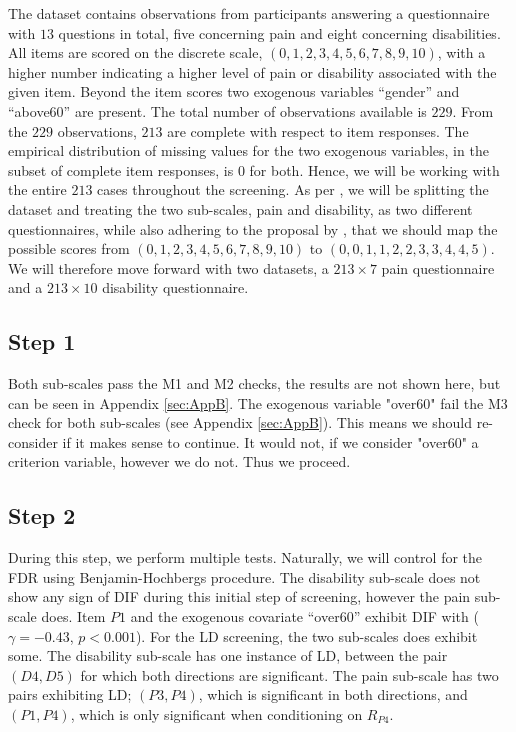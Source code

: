 \documentclass[a4project,12pt]{article}
\theoremstyle{examplestyle}
\theoremstyle{defstyle}
\theoremstyle{thmstyle}
\begin{document}
The dataset contains observations from participants answering a questionnaire with $13$ questions in total, five concerning pain and eight concerning disabilities. All items are scored on the discrete scale, $(0,1,2,3,4,5,6,7,8,9,10)$, with a higher number indicating a higher level of pain or disability associated with the given item. Beyond the item scores two exogenous variables ``gender'' and ``above60'' are present. The total number of observations available is $229$. From the $229$ observations, $213$ are complete with respect to item responses. The empirical distribution of missing values for the two exogenous variables, in the subset of complete item responses, is $0$ for both. Hence, we will be working with the entire $213$ cases throughout the screening. As per \cite{christensen-et-al-2019}, we will be splitting the dataset and treating the two sub-scales, pain and disability, as two different questionnaires, while also adhering to the proposal by \cite{jerosch-herold-et-al-2018}, that we should map the possible scores from $(0,1,2,3,4,5,6,7,8,9,10)$ to $(0,0,1,1,2,2,3,3,4,4,5)$. We will therefore move forward with two datasets, a $213\times 7$ pain questionnaire and a $213\times 10$ disability questionnaire. 


\subsection{Step 1}
Both sub-scales pass the M1 and M2 checks, the results are not shown here, but can be seen in Appendix \ref{sec:AppB}. The exogenous variable "over60" fail the M3 check for both sub-scales (see Appendix \ref{sec:AppB}). This means we should re-consider if it makes sense to continue. It would not, if we consider "over60" a criterion variable, however we do not. Thus we proceed. 


\subsection{Step 2}
During this step, we perform multiple tests. Naturally, we will control for the FDR using Benjamin-Hochbergs procedure. The disability sub-scale does not show any sign of DIF during this initial step of screening, however the pain sub-scale does. Item $P1$ and the exogenous covariate ``over60'' exhibit DIF with ( $\gamma=-0.43$, $p<0.001$). For the LD screening, the two sub-scales does exhibit some. The disability sub-scale has one instance of LD, between the pair $(D4,D5)$ for which both directions are significant. The pain sub-scale has two pairs exhibiting LD; $(P3,P4)$, which is significant in both directions, and $(P1,P4)$, which is only significant when conditioning on $R_{P4}$. 
\end{document}
